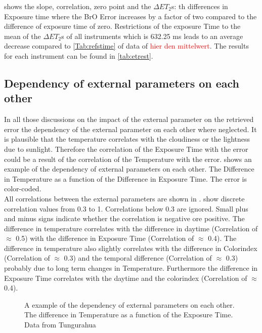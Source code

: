 \documentclass  [
  paper    = a4,
  BCOR     = 10mm,
  twoside,
  fontsize = 12pt,
  fleqn,
  toc      = bibnumbered,
  toc      = listofnumbered,
  numbers  = noendperiod,
  headings = normal,
  listof   = leveldown,
  version  = 3.03
]                                       {scrreprt}
\begin{document}
 shows the slope, correlation, zero point and the $\Delta ET_{2}$s: th differences in Exposure time where the BrO Error increases by a factor of two compared to the difference of exposure time of zero.
Restrictions of the exposure Time to the mean of the $\Delta ET_{2}$s of all instruments which is 632.25 ms leads to an average decrease compared to \cref{Tab:refstime} of data of \textcolor{red}{ hier den mittelwert}. The results for each instrument can be found in \cref{tab:etrest}.


	\subsection*{Dependency of external parameters on each other}
	In all those discussions on the impact of the external parameter on the retrieved   error the  dependency of the external parameter on each other where neglected. It is plausible that the temperature correlates with the cloudiness or the lightness due to sunlight. Therefore the correlation of the Exposure Time with the   error could be a result of the correlation of the Temperature with the   error.  shows an example of the dependency of external parameters on each other. The Difference in Temperature as a function of the Difference in Exposure Time. The   error is color-coded. \\
	All correlations between the external parameters are shown in .  show discrete correlation values from 0.3 to 1. Correlations below 0.3 are ignored. Small plus and minus signs indicate whether the correlation is negative ore positive. 
	The difference in temperature correlates with the difference in daytime (Correlation of $\approx$ 0.5) with the difference in Exposure Time (Correlation of $\approx$ 0.4). The difference in temperature also slightly correlates with the difference in Colorindex (Correlation of $\approx$ 0.3) and the temporal difference (Correlation of $\approx$ 0.3) probably due to long term changes in Temperature. Furthermore the difference in Exposure Time correlates with the daytime and the colorindex (Correlation of $\approx$ 0.4).\\
	\begin{figure}
		\centering
		\caption{A example of the dependency of external parameters on each other. The difference in Temperature as a function of the Exposure Time. Data from Tungurahua}
		\label{fig:difference-in-exposure-time-msdifference-in-temperature-ctungu}
	\end{figure}
\end{document}
